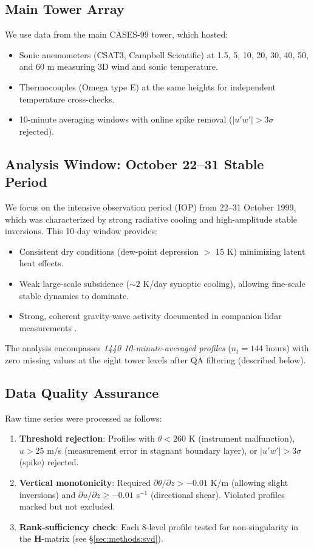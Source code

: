 \documentclass[11pt,a4paper]{article}
\begin{document}
\subsection{Main Tower Array}

We use data from the main CASES-99 tower, which hosted:
\begin{itemize}
  \item Sonic anemometers (CSAT3, Campbell Scientific) at 1.5, 5, 10, 20, 30, 40, 50, and 60 m measuring 3D wind and sonic temperature.
  \item Thermocouples (Omega type E) at the same heights for independent temperature cross-checks.
  \item 10-minute averaging windows with online spike removal ($|u'w'| > 3 \sigma$ rejected).
\end{itemize}

\subsection{Analysis Window: October 22--31 Stable Period}

We focus on the intensive observation period (IOP) from 22--31 October 1999, which was characterized by strong radiative cooling and high-amplitude stable inversions. This 10-day window provides:
\begin{itemize}
  \item Consistent dry conditions (dew-point depression $>$ 15 K) minimizing latent heat effects.
  \item Weak large-scale subsidence ($\sim 2$ K/day synoptic cooling), allowing fine-scale stable dynamics to dominate.
  \item Strong, coherent gravity-wave activity documented in companion lidar measurements \citep{Poulos2002}. %
\end{itemize}

The analysis encompasses \emph{1440 10-minute-averaged profiles} ($n_t = 144$ hours) with zero missing values at the eight tower levels after QA filtering (described below).

\subsection{Data Quality Assurance}

Raw time series were processed as follows:
\begin{enumerate}
  \item \textbf{Threshold rejection}: Profiles with $\theta < 260$ K (instrument malfunction), $u > 25$ m/s (measurement error in stagnant boundary layer), or $|u'w'| > 3\sigma$ (spike) rejected.
  \item \textbf{Vertical monotonicity}: Required $\partial \theta / \partial z > -0.01$ K/m (allowing slight inversions) and $\partial u / \partial z \geq -0.01$ s$^{-1}$ (directional shear). Violated profiles marked but not excluded.
  \item \textbf{Rank-sufficiency check}: Each 8-level profile tested for non-singularity in the $\mathbf{H}$-matrix (see \S\ref{sec:methods:svd}).
\end{enumerate}
\end{document}

